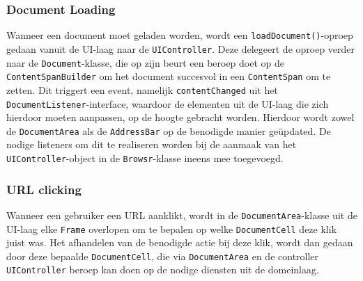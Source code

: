 \documentclass[12pt]{article}
\begin{document}
\subsubsection{Document Loading}
Wanneer een document moet geladen worden, wordt een \texttt{loadDocument()}-oproep gedaan vanuit de UI-laag naar de \texttt{UIController}. Deze delegeert de oproep verder naar de \texttt{Document}-klasse, die op zijn beurt een beroep doet op de \texttt{ContentSpanBuilder} om het document succesvol in een \texttt{ContentSpan} om te zetten. Dit triggert een event, namelijk \texttt{contentChanged} uit het \texttt{DocumentListener}-interface, waardoor de elementen uit de UI-laag die zich hierdoor moeten aanpassen, op de hoogte gebracht worden. Hierdoor wordt zowel de \texttt{DocumentArea} als de \texttt{AddressBar} op de benodigde manier geüpdated. De nodige listeners om dit te realiseren worden bij de aanmaak van het \texttt{UIController}-object in de \texttt{Browsr}-klasse ineens mee toegevoegd.

\subsubsection{URL clicking}
Wanneer een gebruiker een URL aanklikt, wordt in de \texttt{DocumentArea}-klasse uit de UI-laag elke \texttt{Frame} overlopen om te bepalen op welke \texttt{DocumentCell} deze klik juist was. Het afhandelen van de benodigde actie bij deze klik, wordt dan gedaan door deze bepaalde \texttt{DocumentCell}, die via \texttt{DocumentArea} en de controller \texttt{UIController} beroep kan doen op de nodige diensten uit de domeinlaag.
\end{document}
